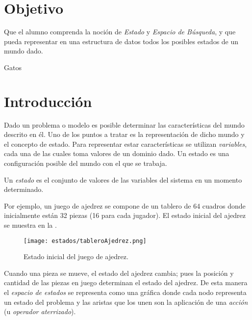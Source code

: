 

\section{Objetivo}
Que el alumno comprenda la noción de \emph{Estado} y \emph{Espacio de Búsqueda}, y que pueda representar en una estructura de datos todos los posibles estados de un mundo dado. \par

\begin{auxcode}
 \caption{Gatos}
 \centering
\end{auxcode}

\section{Introducci\'on}
Dado un problema o modelo es posible determinar las características del mundo descrito en él.  Uno de los puntos a tratar es la representación de dicho mundo y el concepto de estado.  Para representar estar características se utilizan \emph{variables}, cada una de las cuales toma valores de un dominio dado.  Un estado es una configuración posible del mundo con el que se trabaja.

\begin{definition}[Estado]
 Un \emph{estado} es el conjunto de valores de las variables del sistema en un momento determinado.
\end{definition}


Por ejemplo, un juego de ajedrez se compone de un tablero de 64 cuadros donde inicialmente están 32 piezas (16 para cada jugador). El estado inicial del ajedrez se muestra en la .\par

\begin{figure}
  \centering
  \texttt{[image: estados/tableroAjedrez.png]}
  \caption{Estado inicial del juego de ajedrez.}
  \label{fig:ajedrez}
\end{figure}

Cuando una pieza se mueve, el estado del ajedrez cambia; pues la posición y cantidad de las piezas en juego determinan el estado del ajedrez.  De esta manera el \emph{espacio de estados} se representa como una gráfica donde cada nodo representa un estado del problema y las aristas que los unen son la aplicación de una \emph{acción} (u \textit{operador aterrizado}).\par


